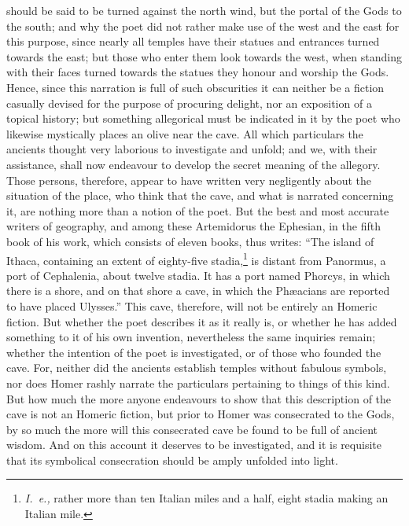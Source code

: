 \documentclass[12pt]{article}
\begin{document}
should be said to be turned against the north wind, but the portal of the Gods
to the south; and why the poet did not rather make use of the west and the east
for this purpose, since nearly all temples have their statues and entrances
turned towards the east; but those who enter them look towards the west, when
standing with their faces turned towards the statues they honour and worship
the Gods. Hence, since this narration is full of such obscurities it can
neither be a fiction casually devised for the purpose of procuring delight, nor
an exposition of a topical history; but something allegorical must be indicated
in it by the poet who likewise mystically places an olive near the cave. All
which particulars the ancients thought very laborious to investigate and
unfold; and we, with their assistance, shall now endeavour to develop the
secret meaning of the allegory. Those persons, therefore, appear to have
written very negligently about the situation of the place, who think that the
cave, and what is narrated concerning it, are nothing more than a notion of the
poet. But the best and most accurate writers of geography, and among these
Artemidorus the Ephesian, in the fifth book of his work, which consists of
eleven books, thus writes: ``The island of Ithaca, containing an extent of
eighty-five stadia,\footnote{\textit{I.~e.,} rather more than ten Italian miles
and a half, eight stadia making an Italian mile.} is distant from Panormus, a
port of Cephalenia, about twelve stadia. It has a port named Phorcys, in which
there is a shore, and on that shore a cave, in which the Ph{\ae}acians are
reported to have placed Ulysses.'' This cave, therefore, will not be entirely
an Homeric fiction. But whether the poet describes it as it really is, or
whether he has added something to it of his own invention, nevertheless the
same inquiries remain; whether the intention of the poet is investigated, or of
those who founded the cave. For, neither did the ancients establish temples
without fabulous symbols, nor does Homer rashly narrate the particulars
pertaining to things of this kind. But how much the more anyone endeavours to
show that this description of the cave is not an Homeric fiction, but prior to
Homer was consecrated to the Gods, by so much the more will this consecrated
cave be found to be full of ancient wisdom. And on this account it deserves to
be investigated, and it is requisite that its symbolical consecration should be
amply unfolded into light.
\end{document}
